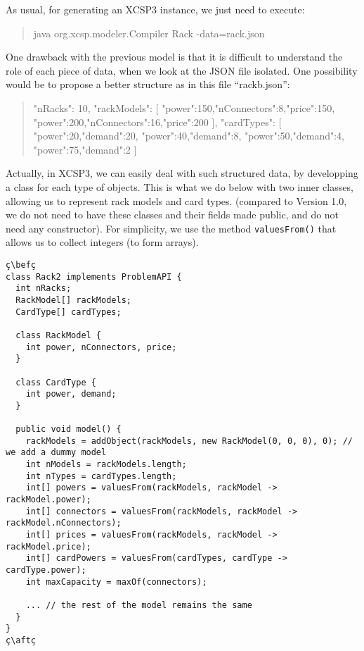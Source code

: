 \documentclass[10pt]{article}
\def\xt{{\rm XCSP3}\xspace}
\newcommand{\nn}[1]{{\tt #1}} %
\def\xt{{\rm XCSP3}\xspace}
\newenvironment{myvb}{\endgraf\small\verbatim}{\endverbatim}
\def\bef{\rule{10cm}{0.1mm}} %
\def\aft{\rule{10cm}{0.1mm}\medskip}
\begin{document}
As usual, for generating an \xt instance, we just need to execute: 
\begin{quote}
\begin{myvb}
java org.xcsp.modeler.Compiler Rack -data=rack.json
\end{myvb}
\end{quote}


One drawback with the previous model is that it is difficult to understand the role of each piece of data, when we look at the JSON file isolated.
One possibility would be to propose a better structure as in this file ``rackb.json'':

{\small
\begin{quote}
\begin{myvb}
{
  "nRacks": 10,
  "rackModels": [
    {"power":150,"nConnectors":8,"price":150},
    {"power":200,"nConnectors":16,"price":200}
  ],
  "cardTypes": [
    {"power":20,"demand":20},
    {"power":40,"demand":8},
    {"power":50,"demand":4},
    {"power":75,"demand":2}
  ]
}
\end{myvb}
\end{quote}
}


Actually, in \xt, we can easily deal with such structured data, by developping a class for each type of objects.
This is what we do below with two inner classes, allowing us to represent rack models and card types.
(compared to Version 1.0, we do not need to have these classes and their fields made public, and do not need any constructor).
For simplicity, we use the method \nn{valuesFrom()} that allows us to collect integers (to form arrays).

\begin{lstlisting}
ç\befç
class Rack2 implements ProblemAPI {
  int nRacks;
  RackModel[] rackModels;
  CardType[] cardTypes;
  
  class RackModel {
    int power, nConnectors, price;
  }
  
  class CardType {
    int power, demand;
  }
  
  public void model() {
    rackModels = addObject(rackModels, new RackModel(0, 0, 0), 0); // we add a dummy model 
    int nModels = rackModels.length;
    int nTypes = cardTypes.length;
    int[] powers = valuesFrom(rackModels, rackModel -> rackModel.power);
    int[] connectors = valuesFrom(rackModels, rackModel -> rackModel.nConnectors);
    int[] prices = valuesFrom(rackModels, rackModel -> rackModel.price);
    int[] cardPowers = valuesFrom(cardTypes, cardType -> cardType.power);
    int maxCapacity = maxOf(connectors);

    ... // the rest of the model remains the same
  }
}
ç\aftç
\end{lstlisting}
\end{document}
